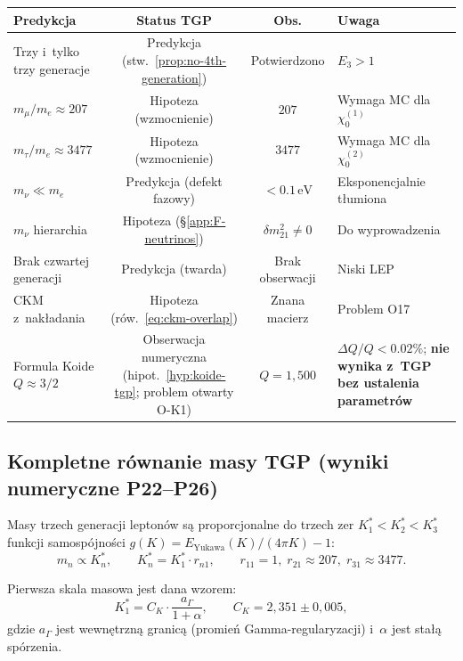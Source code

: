 \begin{center}
\small
\begin{tabular}{@{}>{\raggedright}p{3cm}ccp{5cm}@{}}
\toprule
\textbf{Predykcja} & \textbf{Status TGP} & \textbf{Obs.} & \textbf{Uwaga} \\
\midrule
Trzy i~tylko trzy generacje
  & Predykcja (stw.~\ref{prop:no-4th-generation})
  & Potwierdzono
  & $E_3 > 1$ \\
$m_\mu / m_e \approx 207$ & Hipoteza (wzmocnienie)
  & $207$ & Wymaga MC dla $\chi_0^{(1)}$ \\
$m_\tau / m_e \approx 3477$ & Hipoteza (wzmocnienie)
  & $3477$ & Wymaga MC dla $\chi_0^{(2)}$ \\
$m_\nu \ll m_e$ & Predykcja (defekt fazowy)
  & $< 0.1\,\mathrm{eV}$ & Eksponencjalnie t\l{}umiona \\
$m_\nu$ hierarchia & Hipoteza (\S\ref{app:F-neutrinos})
  & $\delta m_{21}^2 \neq 0$ & Do wyprowadzenia \\
Brak czwartej generacji & Predykcja (twarda)
  & Brak obserwacji & Niski LEP \\
CKM z~nak\l{}adania & Hipoteza (rów.~\ref{eq:ckm-overlap})
  & Znana macierz & Problem O17 \\
Formula Koide $Q \approx 3/2$ & Obserwacja numeryczna
  (hipot.~\ref{hyp:koide-tgp}; problem otwarty O-K1)
  & $Q = 1{,}500$ & $\Delta Q/Q < 0.02\%$;\newline
  \textbf{nie wynika z~TGP bez ustalenia parametr\'ow} \\
\bottomrule
\end{tabular}
\end{center}

\subsection{Kompletne r\'ownanie masy TGP (wyniki numeryczne P22--P26)}%
\label{app:F-mass-eq}

\begin{theorem}%
\label{thm:mass-equation-tgp}
Masy trzech generacji lepton\'ow s\k{a} proporcjonalne do
trzech zer $K^*_1 < K^*_2 < K^*_3$ funkcji samospójno\'sci
$g(K) = E_\mathrm{Yukawa}(K)/(4\pi K) - 1$:
\begin{equation}\label{eq:g-func}
    m_n \propto K^*_n,
    \qquad
    K^*_n = K^*_1 \cdot r_{n1},
    \qquad
    r_{11} = 1,\; r_{21} \approx 207,\; r_{31} \approx 3477.
\end{equation}

Pierwsza skala masowa jest dana wzorem:
\begin{equation}\label{eq:K1-formula}
    K^*_1 = C_K \cdot \frac{a_\Gamma}{1+\alpha},
    \qquad
    C_K = 2{,}351 \pm 0{,}005,
\end{equation}
gdzie $a_\Gamma$ jest wewn\k{e}trzn\k{a} granic\k{a}
(promie\'n Gamma-regularyzacji) i~$\alpha$ jest sta\l{}\k{a}
sp\'orzenia.
\end{theorem}

